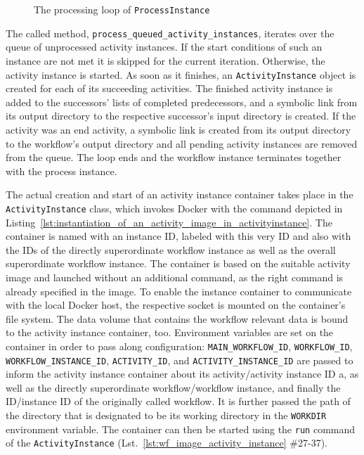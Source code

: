     \begin{figure}[th]
      \inputminted[firstline=28,lastline=45,fontsize=\footnotesize,linenos=true,numberblanklines=true,showspaces=false,breaklines=true,baselinestretch=1,gobble=2]{ruby}{../code/wf_base/process_instance.rb}
      \caption[The processing loop of ProcessInstance]{The processing loop of \texttt{ProcessInstance}}
      \label{fig:the_processing_loop_of_process_instance}
    \end{figure}

    The called method, \texttt{process\_queued\_activity\_instances}, iterates over the queue of unprocessed activity instances. If the start conditions of such an instance are not met it is skipped for the current iteration. Otherwise, the activity instance is started. As soon as it finishes, an \texttt{ActivityInstance} object is created for each of its succeeding activities. The finished activity instance is added to the successors' lists of completed predecessors, and a symbolic link from its output directory to the respective successor's input directory is created. If the activity was an end activity, a symbolic link is created from its output directory to the workflow's output directory and all pending activity instances are removed from the queue. The loop ends and the workflow instance terminates together with the process instance.

    The actual creation and start of an activity instance container takes place in the \texttt{ActivityInstance} class, which invokes Docker with the command depicted in Listing~\ref{lst:instantiation_of_an_activity_image_in_activityinstance}. The container is named with an instance \ac{ID}, labeled with this very \ac{ID} and also with the \acp{ID} of the directly superordinate workflow instance as well as the overall superordinate workflow instance. The container is based on the suitable activity image and launched without an additional command, as the right command is already specified in the image. To enable the instance container to communicate with the local Docker host, the respective socket is mounted on the container's file system. The data volume that contains the workflow relevant data is bound to the activity instance container, too. Environment variables are set on the container in order to pass along configuration: \texttt{MAIN\_WORKFLOW\_ID}, \texttt{WORKFLOW\_ID}, \texttt{WORKFLOW\_INSTANCE\_ID}, \texttt{ACTIVITY\_ID}, and \texttt{ACTIVITY\_INSTANCE\_ID} are passed to inform the activity instance container about its activity/activity instance \ac{ID} a, as well as the directly superordinate workflow/workflow instance, and finally the \ac{ID}/instance \ac{ID} of the originally called workflow. It is further passed the path of the directory that is designated to be its working directory in the \texttt{WORKDIR} environment variable. The container can then be started using the \texttt{run} command of the \texttt{ActivityInstance} (Lst.~\ref{lst:wf_image_activity_instance} \#27-37).


